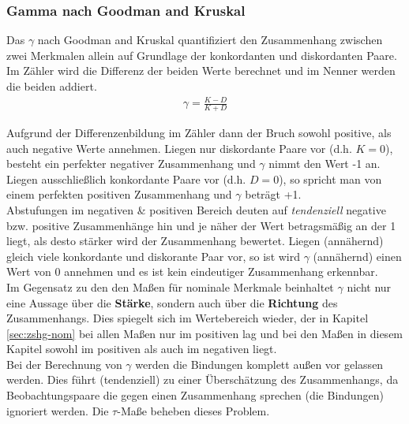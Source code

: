 \documentclass[a4paper]{article}
\newcommand\dangersign{%
 \makebox[1.8em][c]{%
 \makebox[0pt][c]{\raisebox{.15em}{\small!}}%
 \makebox[0pt][c]{\color{red}\Large$\triangle$}}}%
\begin{document}
\clearpage

\subsubsection{Gamma nach Goodman and Kruskal}\label{sec:gamma}
Das $\gamma$ nach Goodman and Kruskal quantifiziert den Zusammenhang zwischen zwei Merkmalen allein auf Grundlage der konkordanten und diskordanten Paare. Im Zähler wird die Differenz der beiden Werte berechnet und im Nenner werden die beiden addiert.
\begin{align*}
    \gamma=\frac{K-D}{K+D}
\end{align*}

Aufgrund der Differenzenbildung im Zähler dann der Bruch sowohl positive, als auch negative Werte annehmen. Liegen nur diskordante Paare vor (d.h. $K = 0$), besteht ein perfekter negativer Zusammenhang und $\gamma$ nimmt den Wert -1 an. Liegen ausschließlich konkordante Paare vor (d.h. $D = 0$), so spricht man von einem perfekten positiven Zusammenhang und $\gamma$ beträgt +1.\\
Abstufungen im negativen \& positiven Bereich deuten auf \textit{tendenziell} negative bzw. positive Zusammenhänge hin und je näher der Wert betragsmäßig an der 1 liegt, als desto stärker wird der Zusammenhang bewertet. Liegen (annähernd) gleich viele konkordante und diskorante Paar vor, so ist wird $\gamma$ (annähernd) einen Wert von 0 annehmen und es ist kein eindeutiger Zusammenhang erkennbar.\\

\noindent \dangersign Im Gegensatz zu den den Maßen für nominale Merkmale beinhaltet $\gamma$ nicht nur eine Aussage über die \textbf{Stärke}, sondern auch über die \textbf{Richtung} des Zusammenhangs. Dies spiegelt sich im Wertebereich wieder, der in Kapitel \ref{sec:zshg-nom} bei allen Maßen nur im positiven lag und bei den Maßen in diesem Kapitel sowohl im positiven als auch im negativen liegt.\\

\noindent \dangersign Bei der Berechnung von $\gamma$ werden die Bindungen komplett außen vor gelassen werden. Dies führt (tendenziell) zu einer Überschätzung des Zusammenhangs, da Beobachtungspaare die gegen einen Zusammenhang sprechen (die Bindungen) ignoriert werden. Die $\tau$-Maße beheben dieses Problem.\\

\noindent  {}
\end{document}
